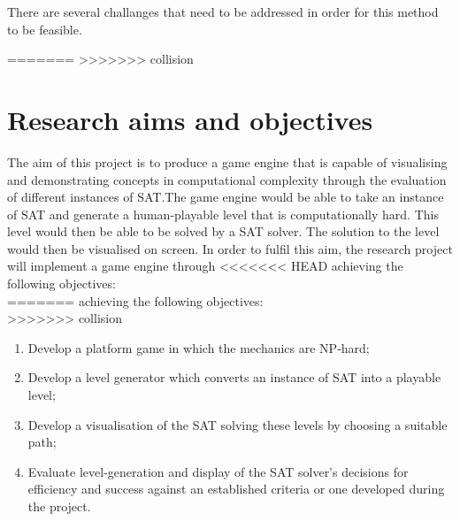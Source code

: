 \documentclass[11pt, a4paper, oneside]{report} %
\begin{document}
There are several challanges that need to be addressed in order for this method
to be feasible.

=======
>>>>>>> collision

\section{Research aims and objectives}


The aim of this project is to produce a game engine that is capable of
visualising and demonstrating concepts in computational complexity through the
evaluation of different instances of SAT.\@ The game engine would be able to
take an instance of SAT and generate a human-playable level that is
computationally hard. This level would then be able to be solved by a SAT
solver. The solution to the level would then be visualised on screen. In order
to fulfil this aim, the research project will implement a game engine through
<<<<<<< HEAD
achieving the following objectives: \\
=======
achieving the following objectives: \\
>>>>>>> collision

\begin{enumerate}

  \item Develop a platform game in which the mechanics are NP-hard;
  \item Develop a level generator which converts an instance of SAT into a playable level;
  \item Develop a visualisation of the SAT solving these levels by choosing a suitable path;
  \item Evaluate level-generation and display of the SAT solver's decisions for
        efficiency and success against an established criteria or one developed
        during the project.

\end{enumerate}
\end{document}
